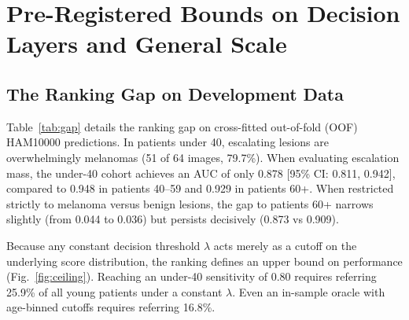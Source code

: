 \documentclass[journal]{IEEEtran}
\newcommand{\uforty}{under-40}
\begin{document}
\section{Pre-Registered Bounds on Decision Layers and General Scale}\label{sec:decision_limits}

\subsection{The Ranking Gap on Development Data}
Table~\ref{tab:gap} details the ranking gap on cross-fitted out-of-fold (OOF) HAM10000 predictions. In patients under 40, escalating lesions are overwhelmingly melanomas (51 of 64 images, 79.7\%). When evaluating escalation mass, the \uforty{} cohort achieves an AUC of only 0.878 [95\% CI: 0.811, 0.942], compared to 0.948 in patients 40--59 and 0.929 in patients 60+. When restricted strictly to melanoma versus benign lesions, the gap to patients 60+ narrows slightly (from 0.044 to 0.036) but persists decisively (0.873 vs 0.909).

Because any constant decision threshold $\lambda$ acts merely as a cutoff on the underlying score distribution, the ranking defines an upper bound on performance (Fig.~\ref{fig:ceiling}). Reaching an \uforty{} sensitivity of 0.80 requires referring 25.9\% of all young patients under a constant $\lambda$. Even an in-sample oracle with age-binned cutoffs requires referring 16.8\%.

\begin{table}[t]
\caption{Ranking Gap on HAM Out-of-Fold Predictions ($N=64/34$ Esc.\ Cases).}
\label{tab:gap}
\centering
{}
\end{table}
\end{document}
